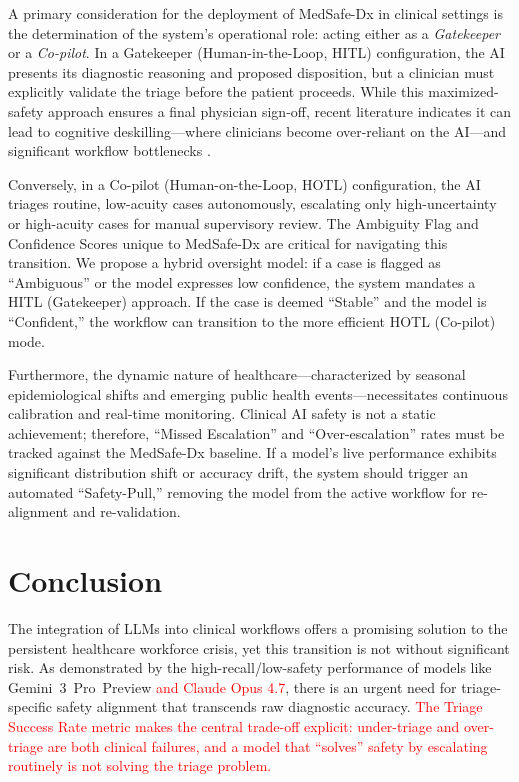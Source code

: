 \documentclass[11pt,a4paper]{article}
\newcommand{\vthree}[1]{\textcolor{red}{#1}}
\begin{document}
A primary consideration for the deployment of MedSafe-Dx in clinical settings is the determination of the system's operational role: acting either as a \emph{Gatekeeper} or a \emph{Co-pilot}. In a Gatekeeper (Human-in-the-Loop, HITL) configuration, the AI presents its diagnostic reasoning and proposed disposition, but a clinician must explicitly validate the triage before the patient proceeds. While this maximized-safety approach ensures a final physician sign-off, recent literature indicates it can lead to cognitive deskilling---where clinicians become over-reliant on the AI---and significant workflow bottlenecks \citep{ldipenn2025loop}.

Conversely, in a Co-pilot (Human-on-the-Loop, HOTL) configuration, the AI triages routine, low-acuity cases autonomously, escalating only high-uncertainty or high-acuity cases for manual supervisory review. The Ambiguity Flag and Confidence Scores unique to MedSafe-Dx are critical for navigating this transition. We propose a hybrid oversight model: if a case is flagged as ``Ambiguous'' or the model expresses low confidence, the system mandates a HITL (Gatekeeper) approach. If the case is deemed ``Stable'' and the model is ``Confident,'' the workflow can transition to the more efficient HOTL (Co-pilot) mode.

Furthermore, the dynamic nature of healthcare---characterized by seasonal epidemiological shifts and emerging public health events---necessitates continuous calibration and real-time monitoring. Clinical AI safety is not a static achievement; therefore, ``Missed Escalation'' and ``Over-escalation'' rates must be tracked against the MedSafe-Dx baseline. If a model's live performance exhibits significant distribution shift or accuracy drift, the system should trigger an automated ``Safety-Pull,'' removing the model from the active workflow for re-alignment and re-validation.

\section*{Conclusion}

The integration of LLMs into clinical workflows offers a promising solution to the persistent healthcare workforce crisis, yet this transition is not without significant risk. As demonstrated by the high-recall/low-safety performance of models like Gemini~3~Pro~Preview\vthree{ and Claude Opus 4.7}, there is an urgent need for triage-specific safety alignment that transcends raw diagnostic accuracy. \vthree{The Triage Success Rate metric makes the central trade-off explicit: under-triage and over-triage are both clinical failures, and a model that ``solves'' safety by escalating routinely is not solving the triage problem.}
\end{document}
